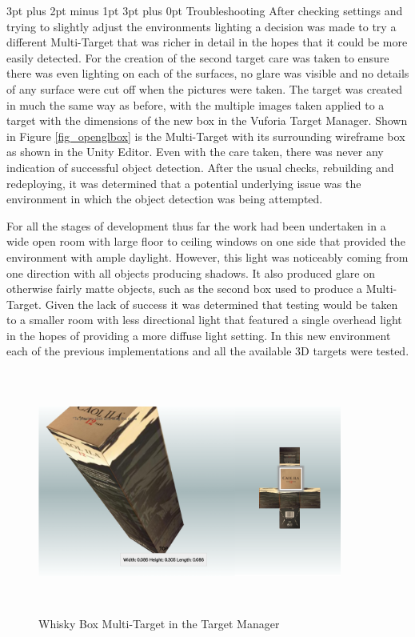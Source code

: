 \documentclass[12pt,a4paper,oneside]{article}
\makeatletter
\renewcommand\paragraph{\@startsection {paragraph}{1}{0mm} %
	                           {3pt plus 2pt minus 1pt} %
	                           {3pt plus 0pt} %
	                           {\normalfont}}
\makeatother
\begin{document}
\paragraph{Troubleshooting}
After checking settings and trying to slightly adjust the environments lighting a decision was made to try a different Multi-Target that was richer in detail in the hopes that it could be more easily detected. For the creation of the second target care was taken to ensure there was even lighting on each of the surfaces, no glare was visible and no details of any surface were cut off when the pictures were taken. The target was created in much the same way as before, with the multiple images taken applied to a target with the dimensions of the new box in the Vuforia Target Manager. Shown in Figure \ref{fig_openglbox} is the Multi-Target with its surrounding wireframe box as shown in the Unity Editor. Even with the care taken, there was never any indication of successful object detection. After the usual checks, rebuilding and redeploying, it was determined that a potential underlying issue was the environment in which the object detection was being attempted.

For all the stages of development thus far the work had been undertaken in a wide open room with large floor to ceiling windows on one side that provided the environment with ample daylight. However, this light was noticeably coming from one direction with all objects producing shadows. It also produced glare on otherwise fairly matte objects, such as the second box used to produce a Multi-Target. Given the lack of success it was determined that testing would be taken to a smaller room with less directional light that featured a single overhead light in the hopes of providing a more diffuse light setting. In this new environment each of the previous implementations and all the available 3D targets were tested.

\begin{figure}[!h]
	\centering
	\includegraphics[width=10cm,height=8cm,keepaspectratio]{images/caolila}
	\caption[Whisky Box Multi-Target]{Whisky Box Multi-Target in the Target Manager}
	\label{fig_caolila}
\end{figure}
\end{document}
